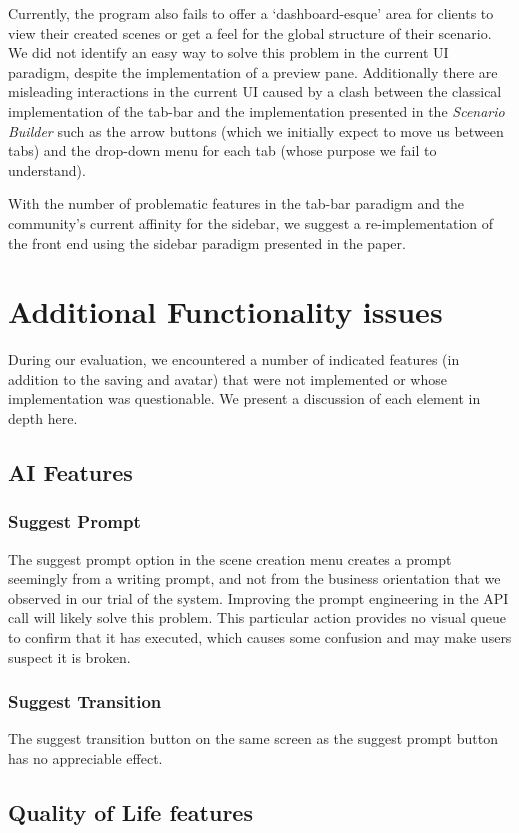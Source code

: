 \documentclass[sigart, anonymous]{acmart} %
\begin{document}
Currently, the program also fails to offer a `dashboard-esque' area for clients to view their created scenes or get a feel for the global structure of their scenario. We did not identify an easy way to solve this problem in the current UI paradigm, despite the implementation of a preview pane. Additionally there are misleading interactions in the current UI caused by a clash between the classical implementation of the tab-bar and the implementation presented in the \textit{Scenario Builder} such as the arrow buttons (which we initially expect to move us between tabs) and the drop-down menu for each tab (whose purpose we fail to understand).

With the number of problematic features in the tab-bar paradigm and the community's current affinity for the sidebar, we suggest a re-implementation of the front end using the sidebar paradigm presented in the paper.


\section{Additional Functionality issues}
During our evaluation, we encountered a number of indicated features (in addition to the saving and avatar) that were not implemented or whose implementation was questionable. We present a discussion of each element in depth here.

\subsection{AI Features}
\subsubsection{Suggest Prompt}
The suggest prompt option in the scene creation menu creates a prompt seemingly from a writing prompt, and not from the business orientation that we observed in our trial of the system. Improving the prompt engineering in the API call will likely solve this problem. This particular action provides no visual queue to confirm that it has executed, which causes some confusion and may make users suspect it is broken.

\subsubsection{Suggest Transition}
The suggest transition button on the same screen as the suggest prompt button has no appreciable effect.

\subsection{Quality of Life features}
\end{document}
